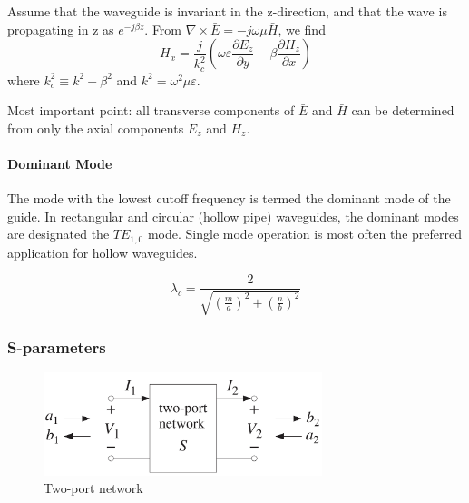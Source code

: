Assume that the waveguide is invariant in the z-direction, and that the wave is propagating in z as $e^{-j\beta z}$. From $\nabla \times \bar{E}=-j\omega \mu \bar{H}$, we find
$$H_x=\frac{j}{k_c^2}(\omega \varepsilon \frac{\partial E_z}{\partial y}-\beta \frac{\partial H_z}{\partial x})$$
where $k_c^2\equiv k^2-\beta ^2$ and $k^2=\omega ^2 \mu \varepsilon$.

Most important point: all transverse components of $\bar{E}$ and $\bar{H}$ can be determined from only the axial components $E_z$ and $H_z$.

\paragraph{Dominant Mode} The mode with the lowest cutoff frequency is termed the dominant mode of the guide. In rectangular and circular (hollow pipe) waveguides, the dominant modes are designated the $TE_{1,0}$ mode. Single mode operation is most often the preferred application for hollow waveguides.

$$\lambda_c=\frac{2}{\sqrt{(\frac{m}{a})^2+(\frac{n}{b})^2}}$$

\subsubsection{S-parameters}


\begin{figure}
  \centering
  \includegraphics[width=3.2in]{fig/S_parameter.png}
  \caption{Two-port network}\label{fig_s_parameter}
\end{figure}


